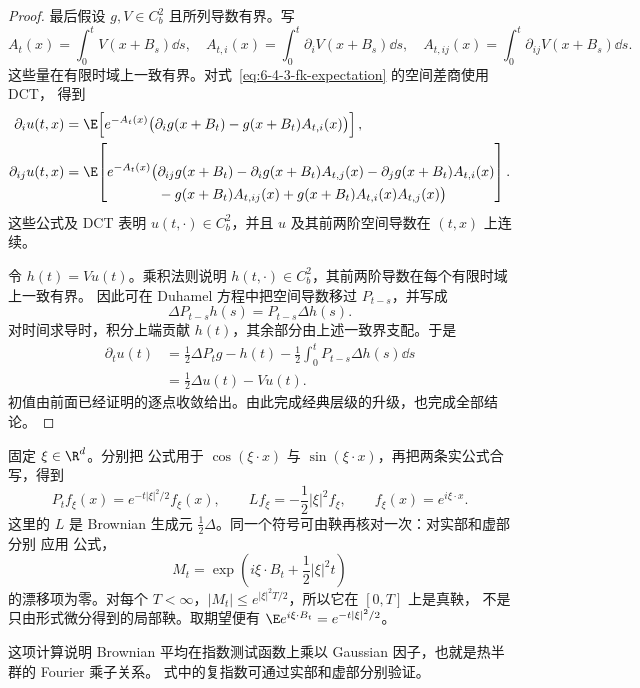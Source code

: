 \begin{proof}
最后假设 $g,V\in C_b^2$ 且所列导数有界。写
\[
 A_t(x)=\int_0^tV(x+B_s)\dd s,\quad
 A_{t,i}(x)=\int_0^t\partial_iV(x+B_s)\dd s,\quad
 A_{t,ij}(x)=\int_0^t\partial_{ij}V(x+B_s)\dd s.
\]
这些量在有限时域上一致有界。对式~\eqref{eq:6-4-3-fk-expectation} 的空间差商使用 DCT，
得到
\begin{align*}
 \partial_i u(t,x)
 &=\E\!\left[e^{-A_t(x)}
   \bigl(\partial_i g(x+B_t)-g(x+B_t)A_{t,i}(x)\bigr)\right],\\
 \partial_{ij}u(t,x)
 &=\E\!\left[e^{-A_t(x)}
 \begin{aligned}[t]
 \bigl(&\partial_{ij}g(x+B_t)
       -\partial_i g(x+B_t)A_{t,j}(x)
       -\partial_j g(x+B_t)A_{t,i}(x)\\
      &-g(x+B_t)A_{t,ij}(x)
       +g(x+B_t)A_{t,i}(x)A_{t,j}(x)\bigr)
 \end{aligned}\right].
\end{align*}
这些公式及 DCT 表明 $u(t,\cdot)\in C_b^2$，并且 $u$ 及其前两阶空间导数在
$(t,x)$ 上连续。

令 $h(t)=Vu(t)$。乘积法则说明 $h(t,\cdot)\in C_b^2$，其前两阶导数在每个有限时域上一致有界。
因此可在 Duhamel 方程中把空间导数移过 $P_{t-s}$，并写成
\[
 \Delta P_{t-s}h(s)=P_{t-s}\Delta h(s).
\]
对时间求导时，积分上端贡献 $h(t)$，其余部分由上述一致界支配。于是
\begin{align*}
 \partial_tu(t)
 &=\frac12\Delta P_tg-h(t)
   -\frac12\int_0^tP_{t-s}\Delta h(s)\dd s\\
 &=\frac12\Delta u(t)-V u(t).
\end{align*}
初值由前面已经证明的逐点收敛给出。由此完成经典层级的升级，也完成全部结论。
\end{proof}

\begin{remark}\label{remark:6-4-3-fourier}
固定 $\xi\in\R^d$。分别把 \Ito{} 公式用于
$\cos(\xi\cdot x)$ 与 $\sin(\xi\cdot x)$，再把两条实公式合写，得到
\[
 P_tf_\xi(x)=e^{-t|\xi|^2/2}f_\xi(x),
 \qquad
 Lf_\xi=-\frac12|\xi|^2f_\xi,
 \qquad f_\xi(x)=e^{i\xi\cdot x}.
\]
这里的 $L$ 是 Brownian 生成元 $\frac12\Delta$。同一个符号可由鞅再核对一次：对实部和虚部分别
应用 \Ito{} 公式，
\[
 M_t=\exp\!\left(i\xi\cdot B_t+\frac12|\xi|^2t\right)
\]
的漂移项为零。对每个 $T<\infty$，$|M_t|\le e^{|\xi|^2T/2}$，所以它在 $[0,T]$ 上是真鞅，
不是只由形式微分得到的局部鞅。取期望便有
$\E e^{i\xi\cdot B_t}=e^{-t|\xi|^2/2}$。

这项计算说明 Brownian 平均在指数测试函数上乘以 Gaussian 因子，也就是热半群的 Fourier 乘子关系。
式中的复指数可通过实部和虚部分别验证。
\end{remark}

